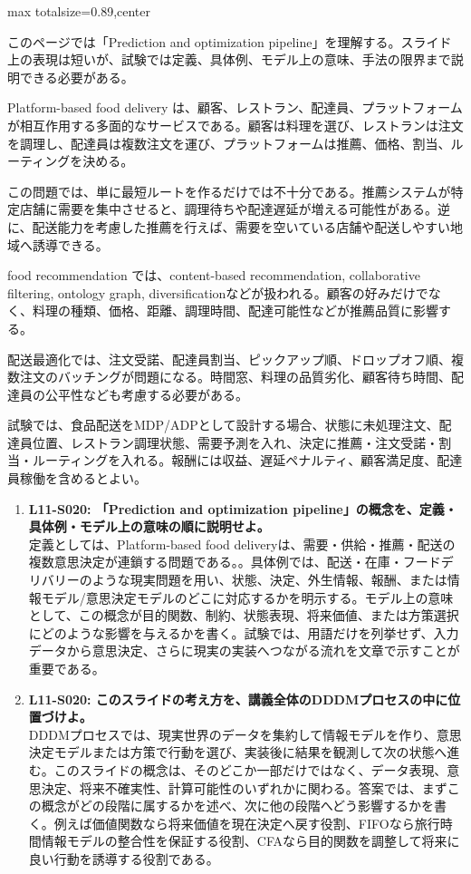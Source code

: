 \begin{minipage}[t]{0.58\textwidth}
\begin{adjustbox}{max totalsize={\textwidth}{0.89\textheight},center}
\begin{minipage}{\textwidth}\scriptsize
{}このページでは「Prediction and optimization pipeline」を理解する。スライド上の表現は短いが、試験では定義、具体例、モデル上の意味、手法の限界まで説明できる必要がある。\par
Platform-based food delivery は、顧客、レストラン、配達員、プラットフォームが相互作用する多面的なサービスである。顧客は料理を選び、レストランは注文を調理し、配達員は複数注文を運び、プラットフォームは推薦、価格、割当、ルーティングを決める。\par
この問題では、単に最短ルートを作るだけでは不十分である。推薦システムが特定店舗に需要を集中させると、調理待ちや配達遅延が増える可能性がある。逆に、配送能力を考慮した推薦を行えば、需要を空いている店舗や配送しやすい地域へ誘導できる。\par
food recommendation では、content-based recommendation, collaborative filtering, ontology graph, diversificationなどが扱われる。顧客の好みだけでなく、料理の種類、価格、距離、調理時間、配達可能性などが推薦品質に影響する。\par
配送最適化では、注文受諾、配達員割当、ピックアップ順、ドロップオフ順、複数注文のバッチングが問題になる。時間窓、料理の品質劣化、顧客待ち時間、配達員の公平性なども考慮する必要がある。\par
試験では、食品配送をMDP/ADPとして設計する場合、状態に未処理注文、配達員位置、レストラン調理状態、需要予測を入れ、決定に推薦・注文受諾・割当・ルーティングを入れる。報酬には収益、遅延ペナルティ、顧客満足度、配達員稼働を含めるとよい。\par{}\begin{enumerate}\item \textbf{L11-S020: 「Prediction and optimization pipeline」の概念を、定義・具体例・モデル上の意味の順に説明せよ。}\\定義としては、Platform-based food deliveryは、需要・供給・推薦・配送の複数意思決定が連鎖する問題である。。具体例では、配送・在庫・フードデリバリーのような現実問題を用い、状態、決定、外生情報、報酬、または情報モデル/意思決定モデルのどこに対応するかを明示する。モデル上の意味として、この概念が目的関数、制約、状態表現、将来価値、または方策選択にどのような影響を与えるかを書く。試験では、用語だけを列挙せず、入力データから意思決定、さらに現実の実装へつながる流れを文章で示すことが重要である。\item \textbf{L11-S020: このスライドの考え方を、講義全体のDDDMプロセスの中に位置づけよ。}\\DDDMプロセスでは、現実世界のデータを集約して情報モデルを作り、意思決定モデルまたは方策で行動を選び、実装後に結果を観測して次の状態へ進む。このスライドの概念は、そのどこか一部だけではなく、データ表現、意思決定、将来不確実性、計算可能性のいずれかに関わる。答案では、まずこの概念がどの段階に属するかを述べ、次に他の段階へどう影響するかを書く。例えば価値関数なら将来価値を現在決定へ戻す役割、FIFOなら旅行時間情報モデルの整合性を保証する役割、CFAなら目的関数を調整して将来に良い行動を誘導する役割である。\end{enumerate}

\end{minipage}
\end{adjustbox}
\end{minipage}
